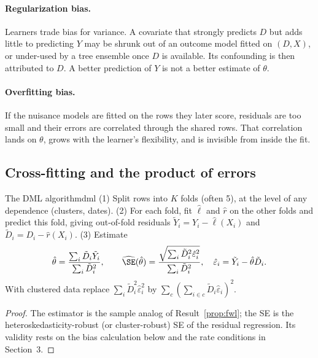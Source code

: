 \documentclass[11pt]{article}
\begin{document}
\paragraph{Regularization bias.} Learners trade bias for variance. A covariate that strongly predicts $D$ but adds little to
predicting $Y$ may be shrunk out of an outcome model fitted on $(D, X)$, or under-used by a tree ensemble once $D$ is available.
Its confounding is then attributed to $D$. A better prediction of $Y$ is not a better estimate of $\theta$.

\paragraph{Overfitting bias.} If the nuisance models are fitted on the rows they later score, residuals are too small and their
errors are correlated through the shared rows. That correlation lands on $\theta$, grows with the learner's flexibility, and is
invisible from inside the fit.

\subsection{Cross-fitting and the product of errors}

\begin{prop}{The DML algorithm}{dml}
(1) Split rows into $K$ folds (often 5), at the level of any dependence (clusters, dates). (2) For each fold, fit $\hat\ell$ and $\hat r$
on the other folds and predict this fold, giving out-of-fold residuals $\tilde Y_i = Y_i - \hat\ell(X_i)$ and $\tilde D_i = D_i - \hat r(X_i)$.
(3) Estimate
\[
  \hat\theta = \frac{\sum_i\tilde D_i\tilde Y_i}{\sum_i\tilde D_i^2}, \qquad
  \widehat\SE(\hat\theta) = \frac{\sqrt{\sum_i\tilde D_i^2\hat\varepsilon_i^2}}{\sum_i\tilde D_i^2}, \quad \hat\varepsilon_i = \tilde Y_i - \hat\theta\tilde D_i .
\]
With clustered data replace $\sum_i\tilde D_i^2\hat\varepsilon_i^2$ by $\sum_c(\sum_{i \in c}\tilde D_i\hat\varepsilon_i)^2$.
\end{prop}
\begin{proof}
The estimator is the sample analog of Result~\ref{prop:fwl}; the SE is the heteroskedasticity-robust (or cluster-robust) SE of
the residual regression. Its validity rests on the bias calculation below and the rate conditions in Section~3.
\end{proof}
\end{document}
